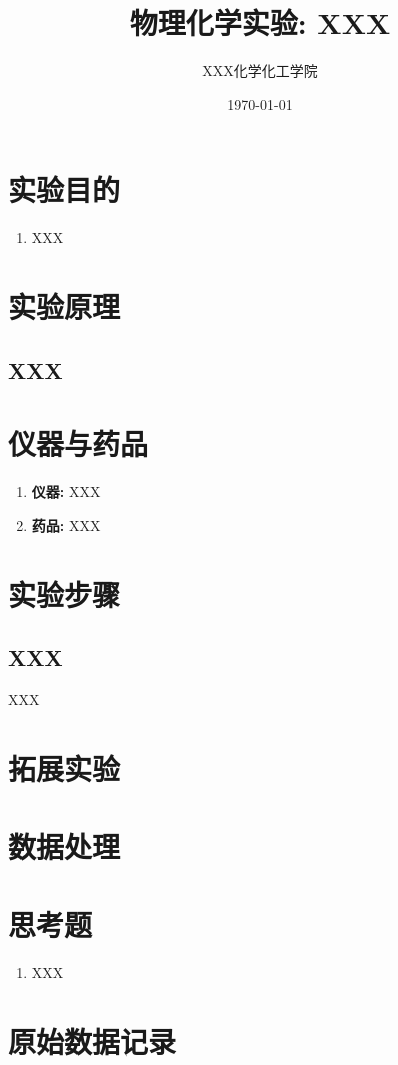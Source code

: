 \documentclass[a4paper]{article}
\title{物理化学实验: XXX}
\author{XXX\quad 123456789\quad 化学化工学院}
\date{\today}
\begin{document}
\maketitle
\section{实验目的}
\begin{enumerate}
\item XXX
\end{enumerate}
\section{实验原理}
\subsection{XXX}
\section{仪器与药品}
\begin{enumerate}
    \item \textbf{仪器:} XXX
    \item \textbf{药品:} XXX
\end{enumerate}
\section{实验步骤}
\subsection{XXX}
XXX
\section{拓展实验}

\newpage
\section{数据处理}

\newpage
\section{思考题}
\begin{enumerate}
	\item XXX
\end{enumerate}
\newpage
\section{原始数据记录}
\begin{table}[H]
	\begin{center}
		\begin{tabular}{l|l}
			\hline
				&	\\
			\hline
		 \end{tabular}
	\end{center}
\end{table}
\end{document}
